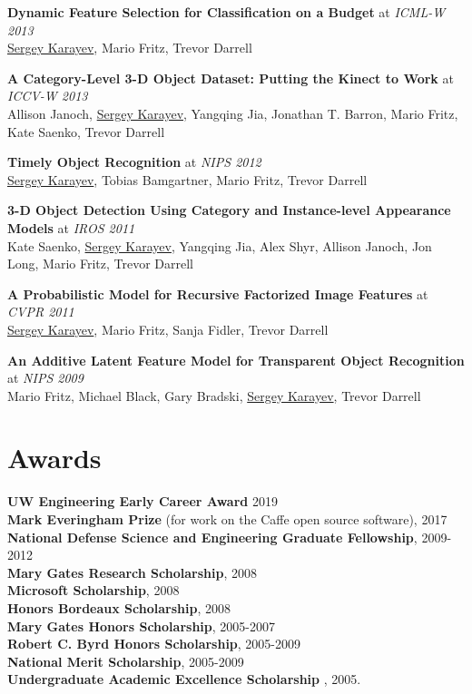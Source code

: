 \documentclass[line, margin]{res}
\begin{document}
\begin{resume}
\textbf{Dynamic Feature Selection for Classification on a Budget} at \emph{ICML-W 2013}\\
\underline{Sergey Karayev}, Mario Fritz, Trevor Darrell

\textbf{A Category-Level 3-D Object Dataset: Putting the Kinect to Work} at \emph{ICCV-W 2013}\\
Allison Janoch, \underline{Sergey Karayev}, Yangqing Jia, Jonathan T. Barron, Mario Fritz, Kate Saenko, Trevor Darrell

\textbf{Timely Object Recognition} at \emph{NIPS 2012}\\
\underline{Sergey Karayev}, Tobias Bamgartner, Mario Fritz, Trevor Darrell

\textbf{3-D Object Detection Using Category and Instance-level Appearance Models} at \emph{IROS 2011}\\
Kate Saenko, \underline{Sergey Karayev}, Yangqing Jia, Alex Shyr, Allison Janoch, Jon Long, Mario Fritz, Trevor Darrell

\textbf{A Probabilistic Model for Recursive Factorized Image Features} at \emph{CVPR 2011}\\
\underline{Sergey Karayev}, Mario Fritz, Sanja Fidler, Trevor Darrell

\textbf{An Additive Latent Feature Model for Transparent Object Recognition} at \emph{NIPS 2009}\\
Mario Fritz, Michael Black, Gary Bradski, \underline{Sergey Karayev}, Trevor Darrell


\section{\sc Awards}
{\bf UW Engineering Early Career Award} 2019\\
{\bf Mark Everingham Prize} (for work on the Caffe open source software), 2017\\
{\bf National Defense Science and Engineering Graduate Fellowship}, 2009-2012\\
{\bf Mary Gates Research Scholarship}, 2008\\
{\bf Microsoft Scholarship}, 2008\\
{\bf Honors Bordeaux Scholarship}, 2008\\
{\bf Mary Gates Honors Scholarship}, 2005-2007\\
{\bf Robert C. Byrd Honors Scholarship}, 2005-2009\\
{\bf National Merit Scholarship}, 2005-2009\\
{\bf Undergraduate Academic Excellence Scholarship} , 2005.

\end{resume}
\end{document}
